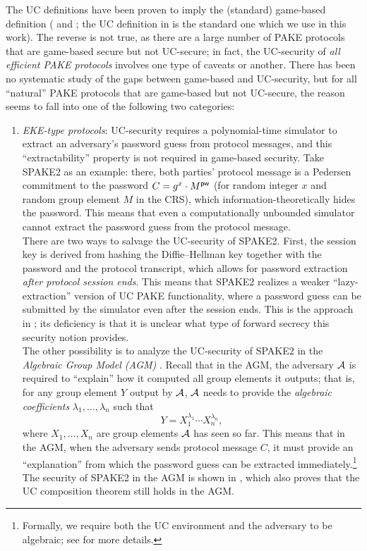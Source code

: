 The UC definitions have been proven to imply the (standard) game-based definition (\cite[Appendix~A]{EC:CHKLM05} and \cite[Section~5]{C:ABBJKX20}; the UC definition in \cite{EC:CHKLM05} is the standard one which we use in this work). The reverse is not true, as there are a large number of PAKE protocols that are game-based secure but not UC-secure; in fact, the UC-security of \emph{all efficient PAKE protocols} involves one type of caveats or another. There has been no systematic study of the gaps between game-based and UC-security, but for all ``natural'' PAKE protocols that are game-based but not UC-secure, the reason seems to fall into one of the following two categories:
\begin{enumerate}
  \item \emph{EKE-type protocols}: UC-security requires a polynomial-time simulator to extract an adversary's password guess from protocol messages, and this ``extractability'' property is not required in game-based security. Take SPAKE2 as an example: there, both parties' protocol message is a Pedersen commitment to the password $C = g^x \cdot M^{\mathsf{pw}}$ (for random integer $x$ and random group element $M$ in the CRS), which information-theoretically hides the password. This means that even a computationally unbounded simulator cannot extract the password guess from the protocol message.\\
      There are two ways to salvage the UC-security of SPAKE2. First, the session key is derived from hashing the Diffie--Hellman key together with the password and the protocol transcript, which allows for password extraction \emph{after protocol session ends}. This means that SPAKE2 realizes a weaker ``lazy-extraction'' version of UC PAKE functionality, where a password guess can be submitted by the simulator even after the session ends. This is the approach in \cite{C:ABBJKX20}; its deficiency is that it is unclear what type of forward secrecy this security notion provides. \\
      The other possibility is to analyze the UC-security of SPAKE2 in the \emph{Algebraic Group Model (AGM)} \cite{C:FucKilLos18}. Recall that in the AGM, the adversary $\mathcal{A}$ is required to ``explain'' how it computed all group elements it outputs; that is, for any group element $Y$ output by $\mathcal{A}$, $\mathcal{A}$ needs to provide the \emph{algebraic coefficients} $\lambda_1,\dots,\lambda_n$ such that
      \[
      Y = X_1^{\lambda_1}\cdots X_n^{\lambda_n},
      \]
      where $X_1,\dots,X_n$ are group elements $\mathcal{A}$ has seen so far. This means that in the AGM, when the adversary sends protocol message $C$, it must provide an ``explanation'' from which the password guess can be extracted immediately.\footnote{Formally, we require both the UC environment and the adversary to be algebraic; see \cite{AC:ABKLX21} for more details.} The security of SPAKE2 in the AGM is shown in \cite{AC:ABKLX21}, which also proves that the UC composition theorem still holds in the AGM.

\end{enumerate}
